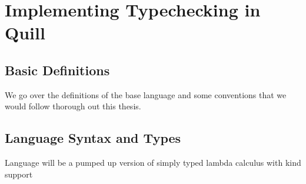 \chapter{Implementing Typechecking in Quill}

\section{Basic Definitions}

We go over the definitions of the base language and some conventions that we would
follow thorough out this thesis.

\section{Language Syntax and Types}

Language will be a pumped up version of simply typed lambda calculus with kind support

